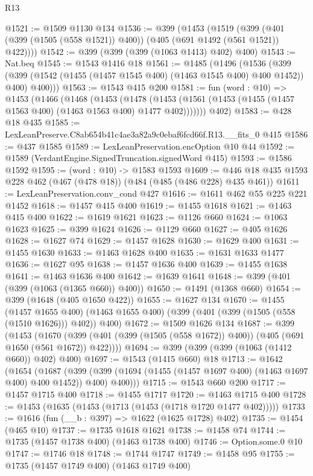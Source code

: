 \begin{lexlean}{R13}
\begin{coremodule}
@1521 := @1509 @1130 @134
@1536 := @399
    (@1453
      (@1519 (@399 (@401 (@399 (@1505 (@558 @1521)) @400)) (@405 (@691 @1492 (@561 @1521)) @422))))
@1542 := @399 (@399 (@399 (@1063 @1413) @402) @400)
@1543 := Nat.beq
@1545 := @1543 @1416 @18
@1561 := @1485
    (@1496
      (@1536
        (@399 (@399 (@1542 (@1455 (@1457 @1545 @400) (@1463 @1545 @400) @400 @1452)) @400) @400)))
@1563 := @1543 @415 @200
@1581 := fun (word : @10) =>
  @1453
    (@1466
      (@1468
        (@1453
          (@1478 (@1453 (@1561 (@1453 (@1455 (@1457 @1563 @400) (@1463 @1563 @400) @1477 @402)))))))
      @402)
@1583 := @428 @18 @435
@1585 := LexLeanPreserve.C8ab654b41c4ae3a82a9c0ebaf6fcd66f.R13.__fits_0 @415
@1586 := @437 @1585
@1589 := LexLeanPreservation.encOption @10 @44
@1592 := @1589 (VerdantEngine.SignedTruncation.signedWord @415)
@1593 := @1586 @1592
@1595 := (word : @10) -> @1583 @1593
@1609 := @446 @18 @435 @1593 @228 @462 (@467 (@478 @18)) (@484 (@485 (@486 @228) @435 @461))
@1611 := LexLeanPreservation.conv_cond @427
@1616 := @1611 @462 @55 @225 @221 @1452
@1618 := @1457 @415 @400
@1619 := @1455 @1618
@1621 := @1463 @415 @400
@1622 := @1619 @1621
@1623 := @1126 @660
@1624 := @1063 @1623
@1625 := @399 @1624
@1626 := @1129 @660
@1627 := @405 @1626
@1628 := @1627 @74
@1629 := @1457 @1628
@1630 := @1629 @400
@1631 := @1455 @1630
@1633 := @1463 @1628 @400
@1635 := @1631 @1633 @1477
@1636 := @1627 @95
@1638 := @1457 @1636 @400
@1639 := @1455 @1638
@1641 := @1463 @1636 @400
@1642 := @1639 @1641
@1648 := @399 (@401 (@399 (@1063 (@1365 @660)) @400))
@1650 := @1491 (@1368 @660)
@1654 := @399 (@1648 (@405 @1650 @422))
@1655 := @1627 @134
@1670 := @1455
    (@1457 @1655 @400)
    (@1463 @1655 @400)
    (@399 (@401 (@399 (@1505 (@558 (@1510 @1626))) @402)) @400)
@1672 := @1509 @1626 @134
@1687 := @399
    (@1453
      (@1670 (@399 (@401 (@399 (@1505 (@558 @1672)) @400)) (@405 (@691 @1650 (@561 @1672)) @422))))
@1694 := @399 (@399 (@399 (@1063 (@1412 @660)) @402) @400)
@1697 := @1543 (@1415 @660) @18
@1713 := @1642
    (@1654
      (@1687
        (@399 (@399 (@1694 (@1455 (@1457 @1697 @400) (@1463 @1697 @400) @400 @1452)) @400) @400)))
@1715 := @1543 @660 @200
@1717 := @1457 @1715 @400
@1718 := @1455 @1717
@1720 := @1463 @1715 @400
@1728 := @1453 (@1635 (@1453 (@1713 (@1453 (@1718 @1720 @1477 @402)))))
@1733 := @1616 (fun (__b : @397) => @1622 (@1625 @1728) @402)
@1735 := @1454 (@465 @10)
@1737 := @1735 @1618 @1621
@1738 := @1458 @74
@1744 := @1735 (@1457 @1738 @400) (@1463 @1738 @400)
@1746 := Option.some.{0} @10
@1747 := @1746 @18
@1748 := @1744 @1747
@1749 := @1458 @95
@1755 := @1735 (@1457 @1749 @400) (@1463 @1749 @400)

\end{coremodule}
\end{lexlean}
